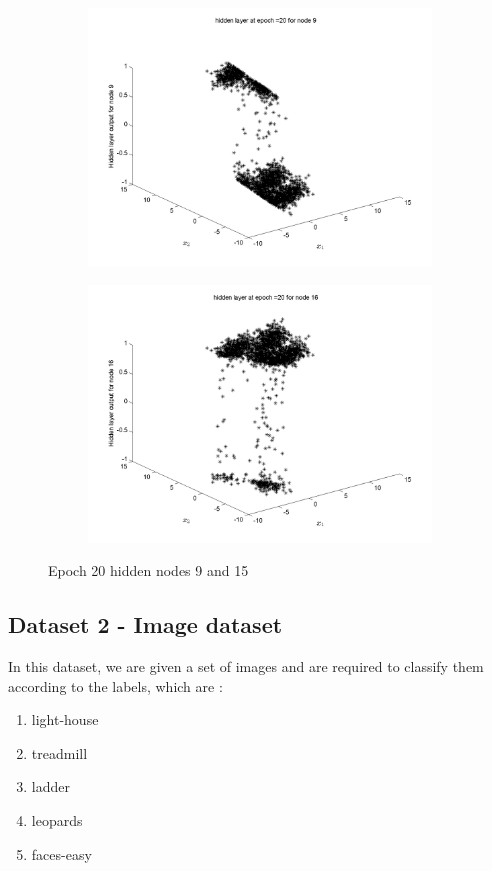 \documentclass{article}
\begin{document}
\begin{figure}
\begin{subfigure}{.5\textwidth}
  \centering
  \includegraphics[width=.8\linewidth]{Classification/overlapping/h20_9}
 
\end{subfigure}%
\begin{subfigure}{.5\textwidth}
  \centering
  \includegraphics[width=.8\linewidth]{Classification/overlapping/h20_15}
  \end{subfigure}
\caption{Epoch 20 hidden nodes 9 and 15}
\end{figure}
\newpage
\subsection{Dataset 2 - Image dataset}
In this dataset, we are given a set of images and are required to classify them according to the labels, which are  :


\begin{enumerate}

\item    light-house

\item    treadmill

\item    ladder

\item    leopards

\item    faces-easy


\end{enumerate}
\end{document}
